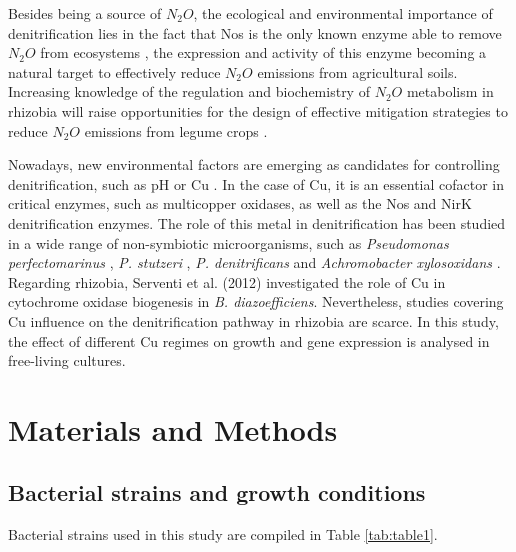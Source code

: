 \documentclass[a4paper,11pt]{article}
\begin{document}
Besides being a source of $N_2O$, the ecological and environmental importance of denitrification
lies in the fact that Nos is the only known enzyme able to remove $N_2O$ from
ecosystems \cite{richardson2009mitigating}, the expression and activity of this enzyme becoming a natural target to effectively reduce $N_2O$ emissions from agricultural soils. Increasing knowledge of the regulation
and biochemistry of $N_2O$ metabolism in rhizobia will raise opportunities for the design of effective mitigation strategies to reduce $N_2O$ emissions from legume crops \cite{bakken2017sources}.

Nowadays, new environmental factors are emerging as candidates for controlling
denitrification, such as pH \cite{carreira2020effect}\cite{olaya2021effect} or Cu \cite{black2016influence}. In the case of Cu, it is an essential cofactor in
critical enzymes, such as multicopper oxidases, as well as the Nos and NirK denitrification
enzymes. The role of this metal in denitrification has been studied in a wide range of
non-symbiotic microorganisms, such as {\em Pseudomonas perfectomarinus} \cite{matsubara1982modulation}, {\em P. stutzeri} \cite{black2016influence},
{\em P. denitrificans} \cite{felgate2012impact}\cite{sullivan2013copper} and {\em Achromobacter xylosoxidans} \cite{felgate2012impact}. Regarding rhizobia, Serventi et al.
(2012) \cite{serventi2012copper} investigated the role of Cu in cytochrome oxidase biogenesis in {\em B. diazoefficiens}.
Nevertheless, studies covering Cu influence on the denitrification pathway in rhizobia are
scarce. In this study, the effect of different Cu regimes on growth and gene expression is analysed in free-living cultures.

\section{Materials and Methods}
\subsection{Bacterial strains and growth conditions}
Bacterial strains used in this study are compiled in Table \ref{tab:table1}. 
\end{document}
